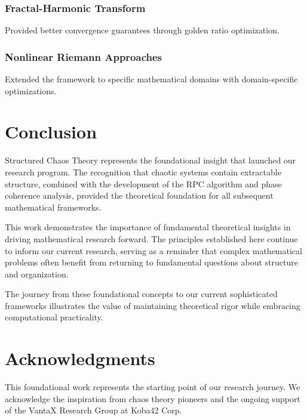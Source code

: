 \documentclass[12pt]{article}
\begin{document}
\subsubsection{Fractal-Harmonic Transform}
Provided better convergence guarantees through golden ratio optimization.

\subsubsection{Nonlinear Riemann Approaches}
Extended the framework to specific mathematical domains with domain-specific optimizations.

\section{Conclusion}

Structured Chaos Theory represents the foundational insight that launched our research program. The recognition that chaotic systems contain extractable structure, combined with the development of the RPC algorithm and phase coherence analysis, provided the theoretical foundation for all subsequent mathematical frameworks.

This work demonstrates the importance of fundamental theoretical insights in driving mathematical research forward. The principles established here continue to inform our current research, serving as a reminder that complex mathematical problems often benefit from returning to fundamental questions about structure and organization.

The journey from these foundational concepts to our current sophisticated frameworks illustrates the value of maintaining theoretical rigor while embracing computational practicality.

\section{Acknowledgments}

This foundational work represents the starting point of our research journey. We acknowledge the inspiration from chaos theory pioneers and the ongoing support of the VantaX Research Group at Koba42 Corp.



\end{document}
